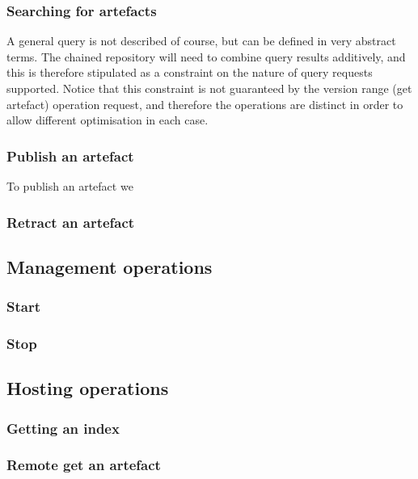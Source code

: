 \documentclass[a4paper,titlepage,twoside,12pt]{article}
\begin{document}
\subsubsection{Searching for artefacts}
A general query is not described of course, but can be defined in very abstract terms. The chained repository will need to combine query results additively, and this is therefore stipulated as a constraint on the nature of query requests supported. Notice that this constraint is not guaranteed by the version range (get artefact) operation request, and therefore the operations are distinct in order to allow different optimisation in each case.

\subsubsection{Publish an artefact}
To publish an artefact we 

\subsubsection{Retract an artefact}

\subsection{Management operations}

\subsubsection{Start}

\subsubsection{Stop}

\subsection{Hosting operations}

\subsubsection{Getting an index}

\subsubsection{Remote get an artefact}
\end{document}
